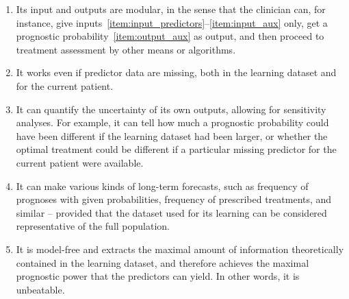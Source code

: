 \documentclass[utf8]{FrontiersinHarvard} %
\renewcommand*{\|}[1][]{\nonscript\:#1\vert\nonscript\:\mathopen{}}
\begin{document}
\begin{enumerate}
\item\label{item:feat_modular_inout} Its input and outputs are modular, in the sense that the clinician can, for instance, give inputs~\ref{item:input_predictors}--\ref{item:input_aux} only, get a prognostic probability~\ref{item:output_aux} as output, and then proceed to treatment assessment by other means or algorithms.

\item\label{item:feat_imputation} It works even if predictor data are missing, both in the learning dataset and for the current patient.

\item\label{item:feat_uncertainty} It can quantify the uncertainty of its own outputs, allowing for sensitivity analyses. For example, it can tell how much a prognostic probability could have been different if the learning dataset had been larger, or whether the optimal treatment could be different if a particular missing predictor for the current patient were available.

\item\label{item:feat_forecast} It can make various kinds of long-term forecasts, such as frequency of prognoses with given probabilities, frequency of prescribed treatments, and similar -- provided that the dataset used for its learning can be considered representative of the full population.

\item\label{item:feat_unbeatable} It is model-free and extracts the maximal amount of information theoretically contained in the learning dataset, and therefore achieves the maximal prognostic power that the predictors can yield. In other words, it is unbeatable.

\end{enumerate}
\end{document}
